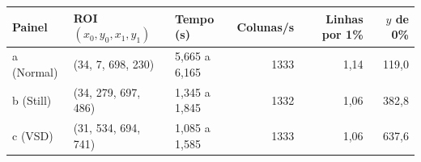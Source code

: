 \begin{tabular}{lllrrr}
\toprule
\textbf{Painel} & \textbf{ROI $(x_0, y_0, x_1, y_1)$} & \textbf{Tempo (s)} & \textbf{Colunas/s} & \textbf{Linhas por 1\%} & \textbf{$y$ de 0\%} \\
\midrule
a (Normal) & (34, 7, 698, 230) & 5{,}665 a 6{,}165 & 1333 & 1{,}14 & 119{,}0 \\
b (Still) & (34, 279, 697, 486) & 1{,}345 a 1{,}845 & 1332 & 1{,}06 & 382{,}8 \\
c (VSD) & (31, 534, 694, 741) & 1{,}085 a 1{,}585 & 1333 & 1{,}06 & 637{,}6 \\
\bottomrule
\end{tabular}
